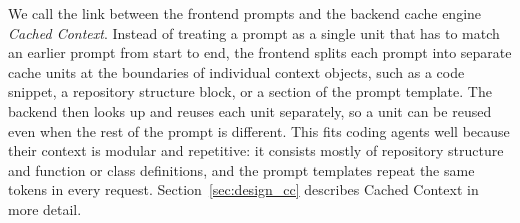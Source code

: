 We call the link between the frontend prompts and the backend cache engine \emph{Cached Context}. Instead of treating a prompt as a single unit that has to match an earlier prompt from start to end, the frontend splits each prompt into separate cache units at the boundaries of individual context objects, such as a code snippet, a repository structure block, or a section of the prompt template. The backend then looks up and reuses each unit separately, so a unit can be reused even when the rest of the prompt is different. This fits coding agents well because their context is modular and repetitive: it consists mostly of repository structure and function or class definitions, and the prompt templates repeat the same tokens in every request. Section~\ref{sec:design_cc} describes Cached Context in more detail.
